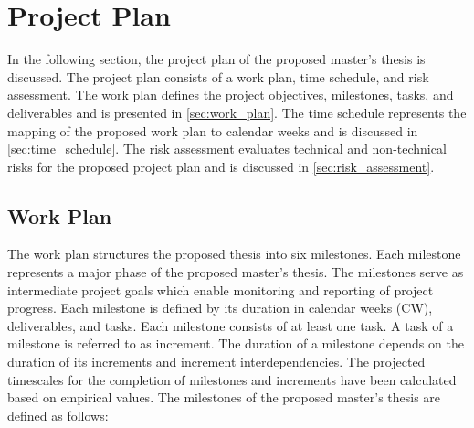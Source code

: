 \chapter{Project Plan}
\label{ch:project_plan}
In the following section, the project plan of the proposed master's thesis is discussed.
The project plan consists of a work plan, time schedule, and risk assessment.
The work plan defines the project objectives, milestones, tasks, and deliverables and is presented in \autoref{sec:work_plan}.
The time schedule represents the mapping of the proposed work plan to calendar weeks and is discussed in \autoref{sec:time_schedule}.
The risk assessment evaluates technical and non-technical risks for the proposed project plan and is discussed in \autoref{sec:risk_assessment}.

\section{Work Plan}
\label{sec:work_plan}
The work plan structures the proposed thesis into six milestones.
Each milestone represents a major phase of the proposed master's thesis.
The milestones serve as intermediate project goals which enable monitoring and reporting of project progress.
Each milestone is defined by its duration in calendar weeks (CW), deliverables, and tasks.
Each milestone consists of at least one task.
A task of a milestone is referred to as increment.
The duration of a milestone depends on the duration of its increments and increment interdependencies.
The projected timescales for the completion of milestones and increments have been calculated based on empirical values.
The milestones of the proposed master's thesis are defined as follows:
